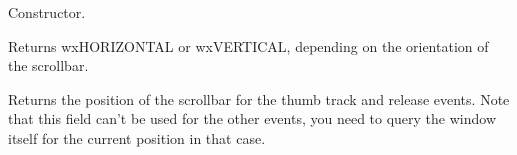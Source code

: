 
Constructor.

\label{wxscrollwineventgetorientation}


Returns wxHORIZONTAL or wxVERTICAL, depending on the orientation of the scrollbar.

\label{wxscrollwineventgetposition}


Returns the position of the scrollbar for the thumb track and release events.
Note that this field can't be used for the other events, you need to query
the window itself for the current position in that case.


